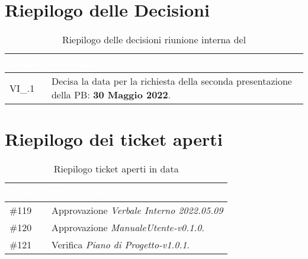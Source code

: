 \section{Riepilogo delle Decisioni}


\begin{table}[!htbp]
    \renewcommand{\arraystretch}{1.5}
    \begin{tabular}{m{}<{\centering}  m{}<{\centering}}
        \rowcolor{darkblue} \textcolor{white}{\textbf{Codice}} & \textcolor{white}{\textbf{Decisione}}                        \\
        \hline
        VI\_{}\D{}.1                                           & Decisa la data per la richiesta della seconda presentazione della PB: \textbf{30 Maggio 2022}. 
    \end{tabular}
    \caption{Riepilogo delle decisioni riunione interna del \D}
\end{table}

\section{Riepilogo dei ticket aperti}

\begin{table}[!htbp]
    \renewcommand{\arraystretch}{1.5}
    \begin{tabular}{m{}<{\centering}  m{}<{\centering}}
        \rowcolor{darkblue} \textcolor{white}{\textbf{Codice}} & \textcolor{white}{\textbf{Descrizione}}                        \\
        \hline
        \#{119}										  & Approvazione \textit{Verbale Interno 2022.05.09} \\
        \#{120}                                         & Approvazione \textit{ManualeUtente-v0.1.0}. \\
        \#{121}										  & Verifica \textit{Piano di Progetto-v1.0.1}.
    \end{tabular}
    \caption{Riepilogo ticket aperti in data \D}
\end{table}
